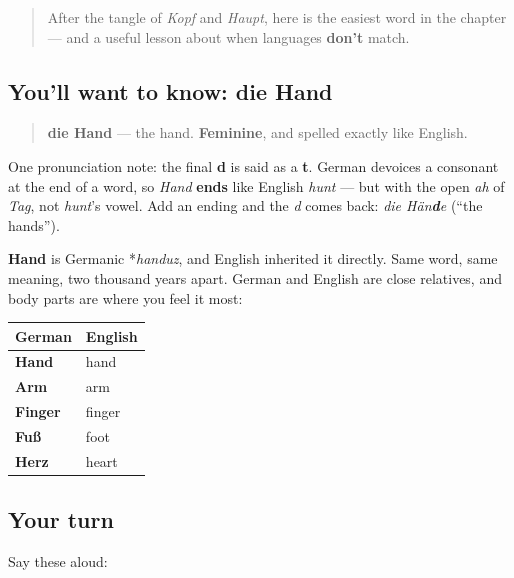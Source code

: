 \label{lesson:GE-C17-hand}



\begin{quote}
After the tangle of \emph{Kopf} and \emph{Haupt}, here is the easiest word in the chapter — and a useful lesson about when languages \textbf{don't} match.
\end{quote}

\subsection*{You'll want to know: die Hand}
\begin{quote}
\textbf{die Hand} — the hand. \textbf{Feminine}, and spelled exactly like English.
\end{quote}

\begin{sounds}
One pronunciation note: the final \textbf{d} is said as a \textbf{t}. German devoices a consonant at the end of a word, so \emph{Hand} \textbf{ends} like English \emph{hunt} — but with the open \emph{ah} of \emph{Tag}, not \emph{hunt}'s vowel. Add an ending and the \emph{d} comes back: \emph{die Hän\textbf{d}e} (\textquotedblleft{}the hands\textquotedblright{}).
\end{sounds}

\begin{cousinweb}
\textbf{Hand} is Germanic *\emph{handuz}, and English inherited it directly. Same word, same meaning, two thousand years apart. German and English are close relatives, and body parts are where you feel it most:

\noindent
\begin{tabularx}{\linewidth}{@{}>{\raggedright\arraybackslash}X>{\raggedright\arraybackslash}X@{}}
\toprule
\textbf{German} & \textbf{English} \\
\midrule
\textbf{Hand} & hand \\
\textbf{Arm} & arm \\
\textbf{Finger} & finger \\
\textbf{Fuß} & foot \\
\textbf{Herz} & heart \\
\bottomrule
\end{tabularx}
\end{cousinweb}

\subsection*{Your turn}
Say these aloud:

